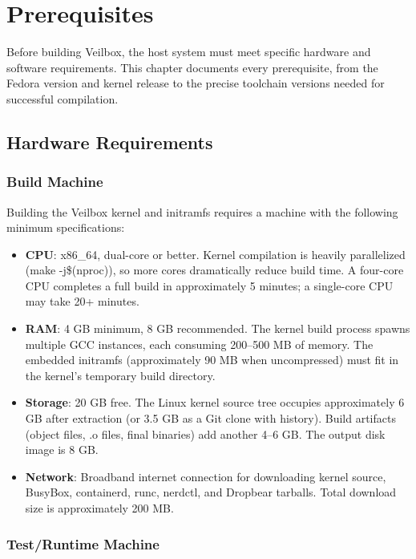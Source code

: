 \chapter{Prerequisites}
\label{ch:prereq}

Before building Veilbox, the host system must meet specific hardware and
software requirements. This chapter documents every prerequisite, from
the Fedora version and kernel release to the precise toolchain versions
needed for successful compilation.

\section{Hardware Requirements}

\subsection{Build Machine}

Building the Veilbox kernel and initramfs requires a machine with the
following minimum specifications:

\begin{itemize}[nosep]
  \item \textbf{CPU}: x86\_64, dual-core or better. Kernel compilation is
        heavily parallelized (make -j\$(nproc)), so more cores dramatically
        reduce build time. A four-core CPU completes a full build in
        approximately 5 minutes; a single-core CPU may take 20+ minutes.
  \item \textbf{RAM}: 4 GB minimum, 8 GB recommended. The kernel build
        process spawns multiple GCC instances, each consuming 200--500 MB
        of memory. The embedded initramfs (approximately 90 MB when
        uncompressed) must fit in the kernel's temporary build directory.
  \item \textbf{Storage}: 20 GB free. The Linux kernel source tree occupies
        approximately 6 GB after extraction (or 3.5 GB as a Git clone with
        history). Build artifacts (object files, .o files, final binaries)
        add another 4--6 GB. The output disk image is 8 GB.
  \item \textbf{Network}: Broadband internet connection for downloading
        kernel source, BusyBox, containerd, runc, nerdctl, and Dropbear
        tarballs. Total download size is approximately 200 MB.
\end{itemize}

\subsection{Test/Runtime Machine}


